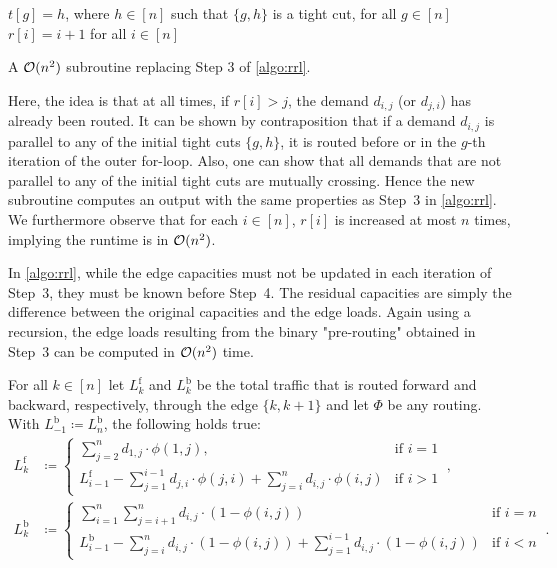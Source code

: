 \begin{algorithm}[H]
	\begin{mdframed}[backgroundcolor=green!10,linecolor=white,innerleftmargin=25pt,leftmargin=-25pt,rightmargin=15pt]
		$t[g] = h$, where $h \in [n]$ such that $\{g, h\}$ is a tight cut, for all $g \in [n]$\;
		$r[i] = i+1$ for all $i \in [n]$\;
	\end{mdframed}
	\caption{A $\mathcal{O}(n^2)$ subroutine replacing Step 3 of \cref{algo:rrl}.}
	\label{algo:step3}
\end{algorithm}
Here, the idea is that at all times, if $r[i] > j$, the demand $d_{i,j}$ (or $d_{j, i}$) has already been routed.
It can be shown by contraposition that if a demand $d_{i,j}$ is parallel to any of the initial tight cuts $\{g, h\}$, it is routed before or in the $g$-th iteration of the outer for-loop.
Also, one can show that all demands that are not parallel to any of the initial tight cuts are mutually crossing.
Hence the new subroutine computes an output with the same properties as Step~3 in \cref{algo:rrl}.
We furthermore observe that for each $i \in [n]$, $r[i]$ is increased at most $n$ times, implying the runtime is in $\mathcal{O}(n^2)$.

In \cref{algo:rrl}, while the edge capacities must not be updated in each iteration of Step~3, they must be known before Step~4.
The residual capacities are simply the difference between the original capacities and the edge loads.
Again using a recursion, the edge loads resulting from the binary "pre-routing" obtained in Step~3 can be computed in $\mathcal{O}(n^2)$ time.

\begin{lemma}
	\label{lemma:link-loads}
	For all $k \in [n]$ let $L_k^\mathrm{f}$ and $L_k^\mathrm{b}$ be the total traffic that is routed forward and backward, respectively, through the edge $\{k, k+1\}$ and let $\Phi$ be any routing. 
	With $L_{-1}^\mathrm{b} \coloneqq L_n^\mathrm{b}$, the following holds true:
		\begin{align}
		L_k^\mathrm{f} &\coloneqq \begin{cases}
			\sum_{j = 2}^n d_{1,j} \cdot \phi(1, j), & \text{if } i = 1 \\
			L_{i-1}^\mathrm{f} - \sum_{j = 1}^{i-1} d_{j,i} \cdot \phi(j, i) + \sum_{j = i}^{n} d_{i,j} \cdot \phi(i, j) & \text{if } i > 1
		\end{cases} \ , \\
		L_k^\mathrm{b} &\coloneqq \begin{cases}
			\sum_{i = 1}^n \sum_{j = i+1}^n d_{i,j} \cdot (1 - \phi(i, j)) & \text{if } i = n\\
			L_{i-1}^\mathrm{b} - \sum_{j = i}^{n} d_{i, j} \cdot (1 - \phi(i, j)) + \sum_{j = 1}^{i-1} d_{i,j} \cdot(1 - \phi(i, j)) & \text{if } i < n
		\end{cases} \ .
	\end{align}
\end{lemma}

